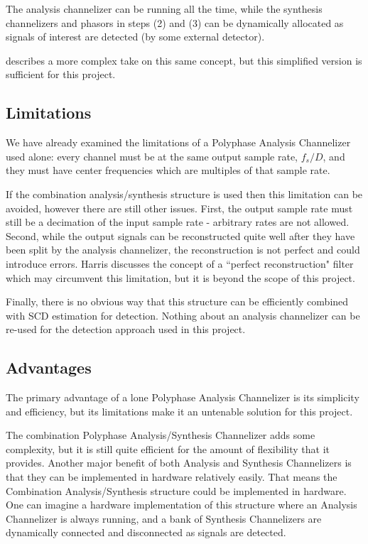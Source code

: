 \documentclass[12pt]{report}
\begin{document}
The analysis channelizer can be running all the time, while the synthesis
channelizers and phasors in steps (2) and (3) can be dynamically allocated as
signals of interest are detected (by some external detector).

\cite{Harris2} describes a more complex take on this same concept, but this
simplified version is sufficient for this project.



\subsection{Limitations}
\label{sec:poly_limitations}
We have already examined the limitations of a Polyphase Analysis
Channelizer used alone: every channel must be at the same output sample
rate, $f_s/D$, and they must have center frequencies which are multiples of
that sample rate.

If the combination analysis/synthesis structure is used then this limitation
can be avoided, however there are still other issues. First, the output sample
rate must still be a decimation of the input sample rate - arbitrary rates are
not allowed. Second, while the output signals can be reconstructed quite well
after they have been split by the analysis channelizer, the reconstruction is
not perfect and could introduce errors. Harris discusses the concept of
a ``perfect reconstruction" filter \cite{Harris2} which may circumvent this
limitation, but it is beyond the scope of this project.

Finally, there is no obvious way that this structure can be efficiently
combined with SCD estimation for detection. Nothing about an analysis
channelizer can be re-used for the detection approach used in this project.

\subsection{Advantages}
\label{sec:poly_advantages}
The primary advantage of a lone Polyphase Analysis Channelizer is its
simplicity and efficiency, but its limitations make it an untenable solution
for this project.

The combination Polyphase Analysis/Synthesis Channelizer adds some complexity,
but it is still quite efficient for the amount of flexibility that it provides.
Another major benefit of both Analysis and Synthesis Channelizers is that they
can be implemented in hardware relatively easily. That means the Combination
Analysis/Synthesis structure could be implemented in hardware. One can imagine
a hardware implementation of this structure where an Analysis Channelizer is
always running, and a bank of Synthesis Channelizers are dynamically connected
and disconnected as signals
are detected.
\end{document}
